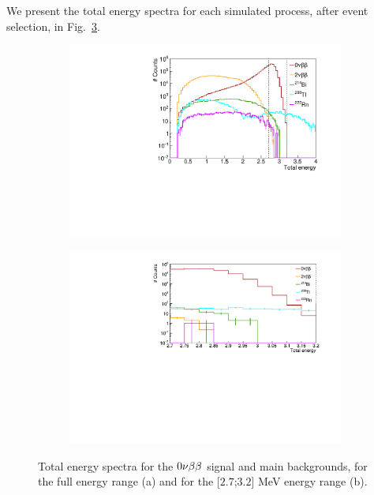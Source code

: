 We present the total energy spectra for each simulated process, after event selection, in Fig.~\ref{fig:sensitivity_energy_spectra}.
\begin{figure}[h]
\centering
\begin{subfigure}[t]{0.48\textwidth}
  \centering
  \includegraphics[width=1.1\textwidth]{Sensitivity/fig_sensitivity/energy_spectrum_with_B_82Se.pdf}
  \captionsetup{justification=centering}
  \caption{
    \label{subfig:sensitivity_energy_spectra_full}}
\end{subfigure}
\hfill
\begin{subfigure}[t]{0.48\textwidth}
  \centering
  \includegraphics[width=1.1\textwidth]{Sensitivity/fig_sensitivity/energy_spectrum_with_B_82Se_zoom.pdf}
  \captionsetup{justification=centering}
  \caption{
    \label{subfig:sensitivity_energy_spectra_zoom}}
\end{subfigure}
\caption{Total energy spectra for the $0\nu\beta\beta$ signal and main backgrounds, for the full energy range (a) and for the [$2.7$;$3.2$] MeV energy range (b).
  \label{fig:sensitivity_energy_spectra}}
\end{figure}
